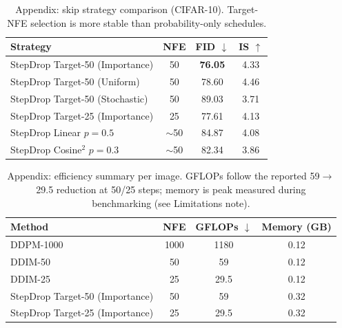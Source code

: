 \documentclass{article}
\begin{document}
\begin{table}[h]
  \centering
  \caption{Appendix: skip strategy comparison (CIFAR-10). Target-NFE selection is more stable than probability-only schedules.}
  \label{tab:skip_strategies_appendix}
  \begin{tabular}{lccc}
    \toprule
    Strategy & NFE & FID $\downarrow$ & IS $\uparrow$ \\
    \midrule
    StepDrop Target-50 (Importance) & 50 & \textbf{76.05} & 4.33 \\
    StepDrop Target-50 (Uniform) & 50 & 78.60 & 4.46 \\
    StepDrop Target-50 (Stochastic) & 50 & 89.03 & 3.71 \\
    StepDrop Target-25 (Importance) & 25 & 77.61 & 4.13 \\
    StepDrop Linear $p{=}0.5$ & $\sim$50 & 84.87 & 4.08 \\
    StepDrop Cosine$^2$ $p{=}0.3$ & $\sim$50 & 82.34 & 3.86 \\
    \bottomrule
  \end{tabular}
\end{table}

\begin{table}[h]
  \centering
  \caption{Appendix: efficiency summary per image. GFLOPs follow the reported 59$\rightarrow$29.5 reduction at 50/25 steps; memory is peak measured during benchmarking (see Limitations note).}
  \label{tab:efficiency_appendix}
  \begin{tabular}{lccc}
    \toprule
    Method & NFE & GFLOPs $\downarrow$ & Memory (GB) \\
    \midrule
    DDPM-1000 & 1000 & 1180 & 0.12 \\
    DDIM-50 & 50 & 59 & 0.12 \\
    DDIM-25 & 25 & 29.5 & 0.12 \\
    StepDrop Target-50 (Importance) & 50 & 59 & 0.32 \\
    StepDrop Target-25 (Importance) & 25 & 29.5 & 0.32 \\
    \bottomrule
  \end{tabular}
\end{table}
\end{document}
